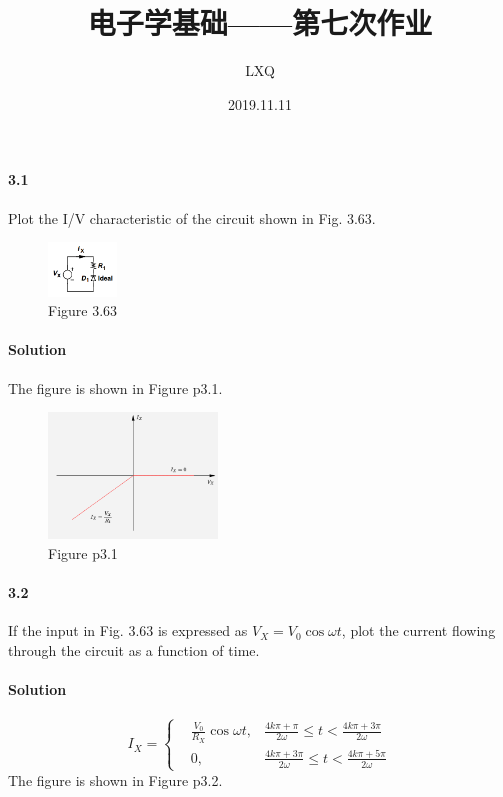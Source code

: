 \documentclass[hyperref, UTF8]{ctexart}
\title{电子学基础——第七次作业}
\author{LXQ}
\date{2019.11.11}
\begin{document}
\maketitle

\paragraph{3.1}
Plot the I/V characteristic of the circuit shown in Fig. 3.63.

\begin{figure}[!htb]
    \centering
    \includegraphics[width=0.163\textwidth]{f3-63.png}
    \caption*{Figure 3.63}
\end{figure}    

\paragraph{Solution} The figure is shown in Figure p3.1.

\begin{figure}[!htb]
    \centering
    \includegraphics[width=0.400\textwidth]{p3-1.png}
    \caption*{Figure p3.1}
\end{figure}    

\paragraph{3.2}
If the input in Fig. 3.63 is expressed as $V_X = V_0\cos \omega t$, plot the current flowing 
through the circuit as a function of time.

\paragraph{Solution}
$$
I_X = \left\{ \begin{aligned} 
    & \frac{V_0}{R_X} \cos \omega t, & \frac{4k\pi + \pi}{2\omega} \le t < \frac{4k\pi + 3\pi}{2\omega} \\
    &  0, & \frac{4k\pi + 3\pi}{2\omega} \le t < \frac{4k\pi + 5\pi}{2\omega} 
\end{aligned}
\right.
$$
The figure is shown in Figure p3.2.
\end{document}
